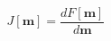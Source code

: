 \begin{equation}
    J[\mathbf{m}] = \frac{d F[\mathbf{m}]}{d \mathbf{m}}
\label{eq:sensitivity}
\end{equation}
